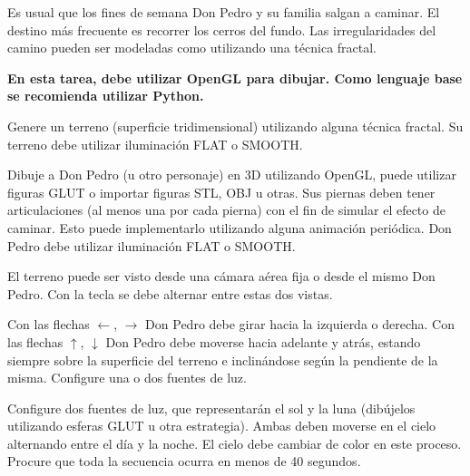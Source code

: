 \documentclass[letterpaper,11pt]{article} %
\begin{document}




Es usual que los fines de semana Don Pedro y su familia salgan a caminar. El destino más frecuente es recorrer los cerros del fundo. Las irregularidades del camino pueden ser modeladas como utilizando una técnica fractal. \\


\textbf{En esta tarea, debe utilizar OpenGL para dibujar. Como lenguaje base se recomienda utilizar Python.}


Genere un terreno (superficie tridimensional) utilizando alguna técnica fractal. Su terreno debe utilizar iluminación FLAT o SMOOTH.


Dibuje a Don Pedro (u otro personaje) en 3D utilizando OpenGL, puede utilizar figuras GLUT o importar figuras STL, OBJ u otras. Sus piernas deben tener articulaciones (al menos una por cada pierna) con el fin de simular el efecto de caminar. Esto puede implementarlo utilizando alguna animación periódica.
Don Pedro debe utilizar iluminación FLAT o SMOOTH.


El terreno puede ser visto desde una cámara aérea fija o desde el mismo Don Pedro. Con la tecla  se debe alternar entre estas dos vistas.

\newp Con las flechas $\leftarrow$, $\rightarrow$ Don Pedro debe girar hacia la izquierda o derecha. Con las flechas $\uparrow$, $\downarrow$ Don Pedro debe moverse hacia adelante y atrás, estando siempre sobre la superficie del terreno e inclinándose según la pendiente de la misma.
Configure una o dos fuentes de luz.


Configure dos fuentes de luz, que representarán el sol y la luna (dibújelos utilizando esferas GLUT u otra estrategia). Ambas deben moverse en el cielo alternando entre el día y la noche. El cielo debe cambiar de color en este proceso. Procure que toda la secuencia ocurra en menos de 40 segundos.
\end{document}
